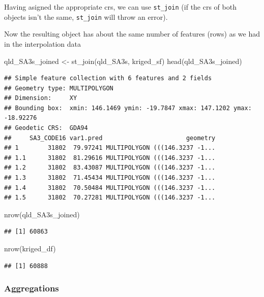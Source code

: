 \documentclass[
]{book}
\newenvironment{Shaded}{\begin{snugshade}}{\end{snugshade}}
\newcommand{\FunctionTok}[1]{\textcolor[rgb]{0.00,0.00,0.00}{#1}}
\newcommand{\NormalTok}[1]{#1}
\newcommand{\OtherTok}[1]{\textcolor[rgb]{0.56,0.35,0.01}{#1}}
\begin{document}
Having asigned the appropriate crs, we can use \texttt{st\_join} (if the crs of both objects isn't the same, \texttt{st\_join} will throw an error).

Now the resulting object has about the same number of features (rows) as we had in the interpolation data

\begin{Shaded}
\begin{Highlighting}[]
\NormalTok{qld\_SA3s\_joined }\OtherTok{\textless{}{-}} \FunctionTok{st\_join}\NormalTok{(qld\_SA3s, kriged\_sf)}
\FunctionTok{head}\NormalTok{(qld\_SA3s\_joined)}
\end{Highlighting}
\end{Shaded}

\begin{verbatim}
## Simple feature collection with 6 features and 2 fields
## Geometry type: MULTIPOLYGON
## Dimension:     XY
## Bounding box:  xmin: 146.1469 ymin: -19.7847 xmax: 147.1202 ymax: -18.92276
## Geodetic CRS:  GDA94
##     SA3_CODE16 var1.pred                       geometry
## 1        31802  79.97241 MULTIPOLYGON (((146.3237 -1...
## 1.1      31802  81.29616 MULTIPOLYGON (((146.3237 -1...
## 1.2      31802  83.43087 MULTIPOLYGON (((146.3237 -1...
## 1.3      31802  71.45434 MULTIPOLYGON (((146.3237 -1...
## 1.4      31802  70.50484 MULTIPOLYGON (((146.3237 -1...
## 1.5      31802  70.27281 MULTIPOLYGON (((146.3237 -1...
\end{verbatim}

\begin{Shaded}
\begin{Highlighting}[]
\FunctionTok{nrow}\NormalTok{(qld\_SA3s\_joined)}
\end{Highlighting}
\end{Shaded}

\begin{verbatim}
## [1] 60863
\end{verbatim}

\begin{Shaded}
\begin{Highlighting}[]
\FunctionTok{nrow}\NormalTok{(kriged\_df)}
\end{Highlighting}
\end{Shaded}

\begin{verbatim}
## [1] 60888
\end{verbatim}

\hypertarget{aggregations}{%
\subsubsection{Aggregations}\label{aggregations}}
\end{document}
